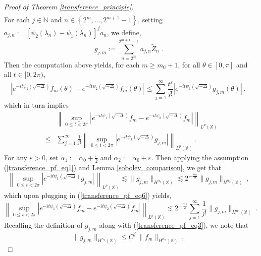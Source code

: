 \documentclass[12pt]{amsart}
\theoremstyle{definition}
\newcommand{\N}{\mathbb N}%
\newcommand{\X}{\mathbb X}%
\numberwithin{equation}{section}
\begin{document}
\begin{proof}[Proof of Theorem \ref{transference_principle}]
\begin{eqnarray*}
\end{eqnarray*}
For each $j \in \N$ and $n \in \left\{2^m, \dots, 2^{m+1}-1\right\}$, setting $a_{j,n}:= \left[\psi_2(\lambda_n)-\psi_1(\lambda_n)\right]^j a_n$, we define,
\begin{equation*}
g_{j,m}:= \sum_{n=2^m}^{2^{m+1}-1} a_{j,n} \tilde{Z}_n\;.
\end{equation*}
Then the computation above yields, for each $m \ge m_0+1$, for all $\theta \in [0,\pi]$ and all $t \in [0,2\pi)$,
\begin{equation*}
\left|e^{-it\psi_1\left(\sqrt{-\Delta}\right)} f_m(\theta)   - e^{-it\psi_2\left(\sqrt{-\Delta}\right)} f_m(\theta) \right| \le  \sum_{j=1}^\infty \frac{t^j}{j!} \left|e^{-it\psi_1\left(\sqrt{-\Delta}\right)} g_{j,m}(\theta)\right|\:,
\end{equation*}
which in turn implies
\begin{eqnarray} \label{transference_pf_eq6}
&&\left\|\sup_{0\le t<2\pi}\left|e^{-it\psi_1\left(\sqrt{-\Delta}\right)} f_m   - e^{-it\psi_2\left(\sqrt{-\Delta}\right)} f_m \right|\right\|_{L^p(\X)} \nonumber\\
&\le & \sum_{j=1}^\infty \frac{1}{j!} \left\| \sup_{0\le t<2\pi} \left|e^{-it\psi_1\left(\sqrt{-\Delta}\right)} g_{j,m}\right|\right\|_{L^p(\X)}\:.
\end{eqnarray}
For any $\varepsilon>0$, set $\alpha_1:=\alpha_0+\frac{\varepsilon}{2}$ and $\alpha_2:=\alpha_0+\varepsilon$. Then applying the assumption (\ref{transference_pf_eq1}) and Lemma \ref{sobolev_comparison}, we get that
\begin{equation*}
\left\| \sup_{0\le t<2\pi} \left|e^{-it\psi_1\left(\sqrt{-\Delta}\right)} g_{j,m}\right|\right\|_{L^p(\X)} \lesssim \|g_{j,m}\|_{H^{\alpha_1}(\X)} \lesssim 2^{-\frac{m\varepsilon}{2}}  \|g_{j,m}\|_{H^{\alpha_2}(\X)}\:,
\end{equation*}
which upon plugging in (\ref{transference_pf_eq6}) yields,
\begin{equation} \label{transference_pf_eq7}
\left\|\sup_{0\le t<2\pi}\left|e^{-it\psi_1\left(\sqrt{-\Delta}\right)} f_m   - e^{-it\psi_2\left(\sqrt{-\Delta}\right)} f_m \right|\right\|_{L^p(\X)} \lesssim 2^{-\frac{m\varepsilon}{2}} \sum_{j=1}^\infty \frac{1}{j!} \|g_{j,m}\|_{H^{\alpha_2}(\X)}\:.
\end{equation}
Recalling the definition of $g_{j,m}$ along with (\ref{transference_pf_eq3}), we note that
\begin{equation*}
\|g_{j,m}\|_{H^{\alpha_2}(\X)} \le C^j\:\|f_m\|_{H^{\alpha_2}(\X)}\:,
\end{equation*}

\end{proof}
\end{document}
